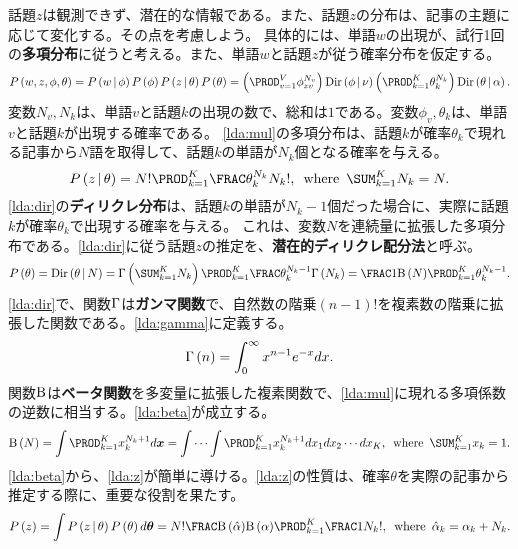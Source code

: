 \documentclass[10pt,a4paper]{book}
\begin{document}
話題$z$は観測できず、潜在的な情報である。また、話題$z$の分布は、記事の主題に応じて変化する。その点を考慮しよう。
具体的には、単語$w$の出現が、試行1回の\textbf{多項分布}に従うと考える。また、単語$w$と話題$z$が従う確率分布を仮定する。
%
\begin{equation}
\label{eq:lda}
\Prob{w,z,\phi,\theta} =
\Prob{w}[\phi] \Prob{\phi} \Prob{z}[\theta] \Prob{\theta} =
\tup{\prod_{v=1}^V \phi_{zv}^{N_v}} \Dd{\phi}{\nu} \tup{\prod_{k=1}^K \theta_k^{N_k}} \Dd{\theta}{\alpha}.
\end{equation}
%
変数$N_v,N_k$は、単語$v$と話題$k$の出現の数で、総和は$1$である。変数$\phi_v,\theta_k$は、単語$v$と話題$k$が出現する確率である。
\eqref{lda:mul}の多項分布は、話題$k$が確率$\theta_k$で現れる記事から$N$語を取得して、話題$k$の単語が$N_k$個となる確率を与える。
%
\begin{equation}
\label{eq:lda:mul}
\Prob{z}[\theta] =
N! \prod_{k=1}^K \frac{\theta_k^{N_k}}{N_k!},
\where
\sum_{k=1}^K N_k = N.
\end{equation}
%
\eqref{lda:dir}の\textbf{ディリクレ分布}は、話題$k$の単語が$N_k-1$個だった場合に、実際に話題$k$が確率$\theta_k$で出現する確率を与える。
これは、変数$N$を連続量に拡張した多項分布である。\eqref{lda:dir}に従う話題$z$の推定を、\textbf{潜在的ディリクレ配分法}と呼ぶ。
%
\begin{equation}
\label{eq:lda:dir}
\Prob{\theta} =
\Dd{\theta}{N} =
\Gd{\sum_{k=1}^K N_k} \prod_{k=1}^K \frac{\theta_k^{N_k-1}}{\Gd{N_k}} =
\frac{1}{\Bd{N}} \prod_{k=1}^K \theta_k^{N_k-1}.
\end{equation}
%
\eqref{lda:dir}で、関数$\Gamma$は\textbf{ガンマ関数}で、自然数の階乗$(n-1)!$を複素数の階乗に拡張した関数である。\eqref{lda:gamma}に定義する。
%
\begin{equation}
\label{eq:lda:gamma}
\Gamma\left(n\right) = \int_0^{\infty} x^{n-1} e^{-x} dx.
\end{equation}
%
関数$\mathrm{B}$は\textbf{ベータ関数}を多変量に拡張した複素関数で、\eqref{lda:mul}に現れる多項係数の逆数に相当する。\eqref{lda:beta}が成立する。
%
\begin{equation}
\label{eq:lda:beta}
\Bd{N} =
\int \prod_{k=1}^K x_k^{N_k+1} d\bm{x} =
\idotsint \prod_{k=1}^K x_k^{N_k+1} dx_1 dx_2 \cdots dx_K,
\where
\sum_{k=1}^K x_k = 1.
\end{equation}
%
\eqref{lda:beta}から、\eqref{lda:z}が簡単に導ける。\eqref{lda:z}の性質は、確率$\theta$を実際の記事から推定する際に、重要な役割を果たす。
%
\begin{equation}
\label{eq:lda:z}
\Prob{z} =
\int \Prob{z}[\theta] \Prob{\theta} d\bm{\theta} =
N! \frac{\Bd{\hat{\alpha}}}{\Bd{\alpha}} \prod_{k=1}^K \frac{1}{N_k!},
\where
\hat{\alpha}_k = \alpha_k + N_k.
\end{equation}
\end{document}
